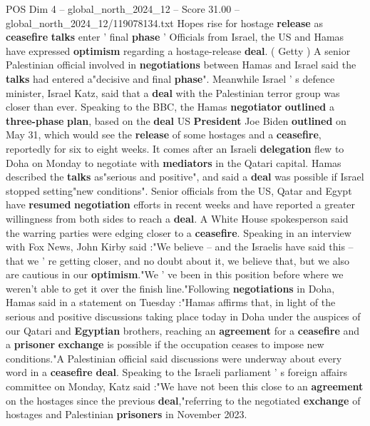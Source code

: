 \begin{textsample}{POS Dim 4 – global\_north\_2024\_12 – Score 31.00 – global\_north\_2024\_12/119078134.txt}  \label{ex:f4_pos_322}
Hopes rise for hostage \textbf{release} as \textbf{ceasefire} \textbf{talks} enter ' final \textbf{phase} ' Officials from Israel, the US and Hamas have expressed \textbf{optimism} regarding a hostage-release \textbf{deal}. ( Getty ) A senior Palestinian official involved in \textbf{negotiations} between Hamas and Israel said the \textbf{talks} had entered a"decisive and final \textbf{phase}".
Meanwhile Israel ' s defence minister, Israel Katz, said that a \textbf{deal} with the Palestinian terror group was closer than ever.
Speaking to the BBC, the Hamas \textbf{negotiator} \textbf{outlined} a \textbf{three-phase} \textbf{plan}, based on the \textbf{deal} US \textbf{President} Joe Biden \textbf{outlined} on May 31, which would see the \textbf{release} of some hostages and a \textbf{ceasefire}, reportedly for six to eight weeks.
It comes after an Israeli \textbf{delegation} flew to Doha on Monday to negotiate with \textbf{mediators} in the Qatari capital.
Hamas described the \textbf{talks} as"serious and positive", and said a \textbf{deal} was possible if Israel stopped setting"new conditions".
Senior officials from the US, Qatar and Egypt have \textbf{resumed} \textbf{negotiation} efforts in recent weeks and have reported a greater willingness from both sides to reach a \textbf{deal}.
A White House spokesperson said the warring parties were edging closer to a \textbf{ceasefire}.
Speaking in an interview with Fox News, John Kirby said :"We believe -- and the Israelis have said this -- that we ' re getting closer, and no doubt about it, we believe that, but we also are cautious in our \textbf{optimism}."We ' ve been in this position before where we weren't able to get it over the finish line."Following \textbf{negotiations} in Doha, Hamas said in a statement on Tuesday :"Hamas affirms that, in light of the serious and positive discussions taking place today in Doha under the auspices of our Qatari and \textbf{Egyptian} brothers, reaching an \textbf{agreement} for a \textbf{ceasefire} and a \textbf{prisoner} \textbf{exchange} is possible if the occupation ceases to impose new conditions."A Palestinian official said discussions were underway about every word in a \textbf{ceasefire} \textbf{deal}.
Speaking to the Israeli parliament ' s foreign affairs committee on Monday, Katz said :"We have not been this close to an \textbf{agreement} on the hostages since the previous \textbf{deal},"referring to the negotiated \textbf{exchange} of hostages and Palestinian \textbf{prisoners} in November 2023.

\end{textsample}
